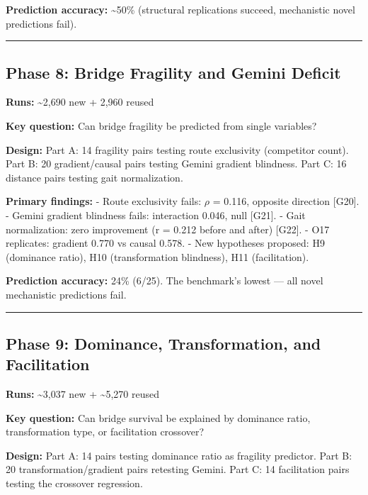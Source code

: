 \textbf{Prediction accuracy:} \textasciitilde50\% (structural replications succeed, mechanistic novel predictions fail).

\begin{center}\rule{0.5\linewidth}{0.5pt}\end{center}

\subsection{Phase 8: Bridge Fragility and Gemini Deficit}\label{phase-8-bridge-fragility-and-gemini-deficit}

\textbf{Runs:} \textasciitilde2,690 new + 2,960 reused

\textbf{Key question:} Can bridge fragility be predicted from single variables?

\textbf{Design:} Part A: 14 fragility pairs testing route exclusivity (competitor count). Part B: 20 gradient/causal pairs testing Gemini gradient blindness. Part C: 16 distance pairs testing gait normalization.

\textbf{Primary findings:} - Route exclusivity fails: \(\rho\) = 0.116, opposite direction {[}G20{]}. - Gemini gradient blindness fails: interaction 0.046, null {[}G21{]}. - Gait normalization: zero improvement (r = 0.212 before and after) {[}G22{]}. - O17 replicates: gradient 0.770 vs causal 0.578. - New hypotheses proposed: H9 (dominance ratio), H10 (transformation blindness), H11 (facilitation).

\textbf{Prediction accuracy:} 24\% (6/25). The benchmark's lowest --- all novel mechanistic predictions fail.

\begin{center}\rule{0.5\linewidth}{0.5pt}\end{center}

\subsection{Phase 9: Dominance, Transformation, and Facilitation}\label{phase-9-dominance-transformation-and-facilitation}

\textbf{Runs:} \textasciitilde3,037 new + \textasciitilde5,270 reused

\textbf{Key question:} Can bridge survival be explained by dominance ratio, transformation type, or facilitation crossover?

\textbf{Design:} Part A: 14 pairs testing dominance ratio as fragility predictor. Part B: 20 transformation/gradient pairs retesting Gemini. Part C: 14 facilitation pairs testing the crossover regression.

